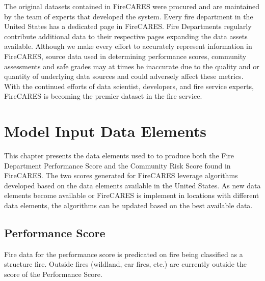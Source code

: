 \documentclass[12pt,oneside]{book}
\begin{document}
The original datasets contained in FireCARES were procured and are maintained by the team of experts that developed the system. Every fire department in the United States has a dedicated page in FireCARES. Fire Departments regularly contribute additional data to their respective pages expanding the data assets available. Although we make every effort to accurately represent information in FireCARES, source data used in determining performance scores, community assessments and safe grades may at times be inaccurate due to the quality and or quantity of underlying data sources and could adversely affect these metrics. With the continued efforts of data scientist, developers, and fire service experts, FireCARES is becoming the premier dataset in the fire service. 

\chapter{Model Input Data Elements}

This chapter presents the data elements used to to produce both the Fire Department Performance Score and the Community Risk Score found in FireCARES. The two scores generated for FireCARES leverage algorithms developed based on the data elements available in the United States. As new data elements become available or FireCARES is implement in locations with different data elements, the algorithms can be updated based on the best available data.

\section{Performance Score}

Fire data for the performance score is predicated on fire being classified as a structure fire. Outside fires (wildland, car fires, etc.) are currently outside the score of the Performance Score.
\end{document}
